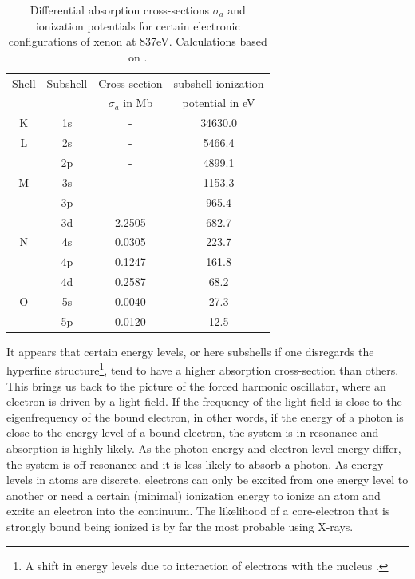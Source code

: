 \begin{table}
	\centering
		\begin{tabular}{ | c | c | c | c | }
			\hline
			Shell & Subshell & Cross-section & subshell ionization \\
				&	&	$\sigma_{a}$ in Mb & potential in eV \\ \hline
			K & 1s & - & 34630.0 \\ \hline
			L & 2s & - & 5466.4  \\ 
			\ & 2p & - & 4899.1 \\ \hline
			M & 3s & - & 1153.3  \\ 
			\ & 3p & - & 965.4 \\ 
			\ & 3d & 2.2505 & 682.7 \\ \hline
			N & 4s & 0.0305 & 223.7 \\ 
			\ & 4p & 0.1247 & 161.8 \\ 
			\ & 4d & 0.2587 & 68.2  \\ \hline
			O & 5s & 0.0040 & 27.3  \\ 
			\ & 5p & 0.0120 & 12.5  \\ \hline
		\end{tabular}
	\caption[Differential absorption cross-sections and ionization potentials for xenon.]{Differential absorption cross-sections $\sigma_{a}$ and ionization potentials for certain electronic configurations of xenon at 837eV. Calculations based on \citep{Cowan-1981-Cal}.}
	\label{tab:xenon-photoionization-cross-section}
\end{table}
It appears that certain energy levels, or here subshells if one disregards the hyperfine structure\footnote{A shift in energy levels due to interaction of electrons with the nucleus \citep[see][p~166~ff.]{Demtroder-2005-Springer}.}, tend to have a higher absorption cross-section than others. This brings us back to the picture of the forced harmonic oscillator, where an electron is driven by a light field. If the frequency of the light field is close to the eigenfrequency of the bound electron, in other words, if the energy of a photon is close to the energy level of a bound electron, the system is in resonance and absorption is highly likely. As the photon energy and electron level energy differ, the system is off resonance and it is less likely to absorb a photon. As energy levels in atoms are discrete, electrons can only be excited from one energy level to another or need a certain (minimal) ionization energy to ionize an atom and excite an electron into the continuum. The likelihood of a core-electron that is strongly bound being ionized is by far the most probable using X-rays.

